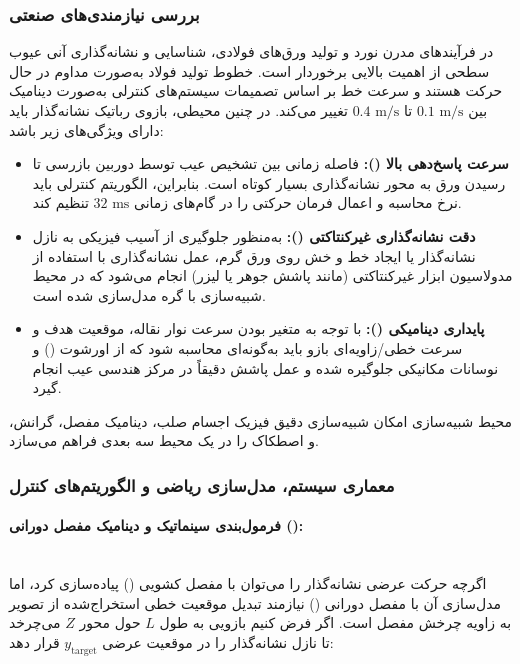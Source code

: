 \documentclass[a4paper, 10pt, twocolumn]{article}
\begin{document}
	\subsubsection*{بررسی نیازمندی‌های صنعتی}
	در فرآیندهای مدرن نورد و تولید ورق‌های فولادی، شناسایی و نشانه‌گذاری آنی عیوب سطحی از اهمیت بالایی برخوردار است. خطوط تولید فولاد به‌صورت مداوم در حال حرکت هستند و سرعت خط بر اساس تصمیمات سیستم‌های کنترلی به‌صورت دینامیک بین $0.1 \text{ m/s}$ تا $0.4 \text{ m/s}$ تغییر می‌کند. در چنین محیطی، بازوی رباتیک نشانه‌گذار باید دارای ویژگی‌های زیر باشد:
	\begin{itemize}
		\item \textbf{سرعت پاسخ‌دهی بالا ():} فاصله زمانی بین تشخیص عیب توسط دوربین بازرسی تا رسیدن ورق به محور نشانه‌گذاری بسیار کوتاه است. بنابراین، الگوریتم کنترلی باید نرخ محاسبه و اعمال فرمان حرکتی را در گام‌های زمانی $32 \text{ ms}$ تنظیم کند.
		\item \textbf{دقت نشانه‌گذاری غیرکنتاکتی ():} به‌منظور جلوگیری از آسیب فیزیکی به نازل نشانه‌گذار یا ایجاد خط و خش روی ورق گرم، عمل نشانه‌گذاری با استفاده از مدولاسیون ابزار غیرکنتاکتی (مانند پاشش جوهر یا لیزر) انجام می‌شود که در محیط شبیه‌سازی با گره  مدل‌سازی شده است.
		\item \textbf{پایداری دینامیکی ():} با توجه به متغیر بودن سرعت نوار نقاله، موقعیت هدف و سرعت خطی/زاویه‌ای بازو باید به‌گونه‌ای محاسبه شود که از اورشوت () و نوسانات مکانیکی جلوگیره شده و عمل پاشش دقیقاً در مرکز هندسی عیب انجام گیرد.
	\end{itemize}
	
	محیط شبیه‌سازی  امکان شبیه‌سازی دقیق فیزیک اجسام صلب، دینامیک مفصل، گرانش، و اصطکاک را در یک محیط سه بعدی فراهم می‌سازد.
	
	\subsubsection*{معماری سیستم، مدل‌سازی ریاضی و الگوریتم‌های کنترل}
	
	\paragraph{فرمول‌بندی سینماتیک و دینامیک مفصل دورانی (): } \mbox{} \\
	اگرچه حرکت عرضی نشانه‌گذار را می‌توان با مفصل کشویی () پیاده‌سازی کرد، اما مدل‌سازی آن با مفصل دورانی () نیازمند تبدیل موقعیت خطی استخراج‌شده از تصویر به زاویه چرخش مفصل است. اگر فرض کنیم بازویی به طول $L$ حول محور $Z$ می‌چرخد تا نازل نشانه‌گذار را در موقعیت عرضی $y_{\text{target}}$ قرار دهد:
	
\end{document}
